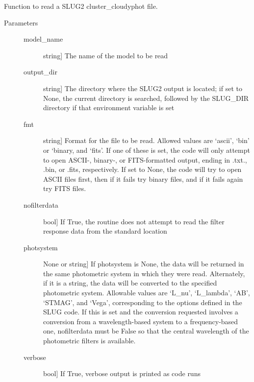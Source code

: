 \documentclass[letterpaper,10pt,english]{sphinxmanual}
\begin{document}
\begin{fulllineitems}
\label{\detokenize{cloudy:slugpy.cloudy.read_cluster_cloudyphot}}
Function to read a SLUG2 cluster\_cloudyphot file.
\begin{description}
\item[{Parameters}] \leavevmode\begin{description}
\item[{model\_name}] \leavevmode{[}string{]}
The name of the model to be read

\item[{output\_dir}] \leavevmode{[}string{]}
The directory where the SLUG2 output is located; if set to None,
the current directory is searched, followed by the SLUG\_DIR
directory if that environment variable is set

\item[{fmt}] \leavevmode{[}string{]}
Format for the file to be read. Allowed values are ‘ascii’,
‘bin’ or ‘binary, and ‘fits’. If one of these is set, the code
will only attempt to open ASCII-, binary-, or FITS-formatted
output, ending in .txt., .bin, or .fits, respectively. If set
to None, the code will try to open ASCII files first, then if
it fails try binary files, and if it fails again try FITS
files.

\item[{nofilterdata}] \leavevmode{[}bool{]}
If True, the routine does not attempt to read the filter
response data from the standard location

\item[{photsystem}] \leavevmode{[}None or string{]}
If photsystem is None, the data will be returned in the same
photometric system in which they were read. Alternately, if it
is a string, the data will be converted to the specified
photometric system. Allowable values are ‘L\_nu’, ‘L\_lambda’,
‘AB’, ‘STMAG’, and ‘Vega’, corresponding to the options defined
in the SLUG code. If this is set and the conversion requested
involves a conversion from a wavelength-based system to a
frequency-based one, nofilterdata must be False so that the
central wavelength of the photometric filters is available.

\item[{verbose}] \leavevmode{[}bool{]}
If True, verbose output is printed as code runs


\end{description}
\end{description}
\end{fulllineitems}
\end{document}
